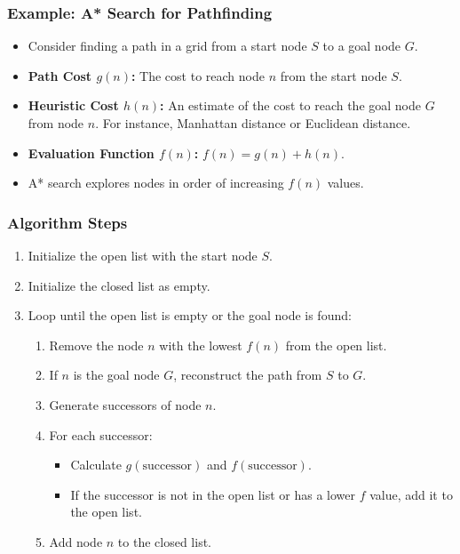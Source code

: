 \documentclass[8pt]{article}
\begin{document}
\subsubsection*{Example: A* Search for Pathfinding}
\begin{itemize}
    \item Consider finding a path in a grid from a start node \(S\) to a goal node \(G\).
    \item \textbf{Path Cost \(g(n)\):} The cost to reach node \(n\) from the start node \(S\).
    \item \textbf{Heuristic Cost \(h(n)\):} An estimate of the cost to reach the goal node \(G\) from node \(n\). For instance, Manhattan distance or Euclidean distance.
    \item \textbf{Evaluation Function \(f(n)\):} \(f(n) = g(n) + h(n)\).
    \item A* search explores nodes in order of increasing \(f(n)\) values.
\end{itemize}

\subsubsection*{Algorithm Steps}
\begin{enumerate}
    \item Initialize the open list with the start node \(S\).
    \item Initialize the closed list as empty.
    \item Loop until the open list is empty or the goal node is found:
    \begin{enumerate}
        \item Remove the node \(n\) with the lowest \(f(n)\) from the open list.
        \item If \(n\) is the goal node \(G\), reconstruct the path from \(S\) to \(G\).
        \item Generate successors of node \(n\).
        \item For each successor:
        \begin{itemize}
            \item Calculate \(g(\text{successor})\) and \(f(\text{successor})\).
            \item If the successor is not in the open list or has a lower \(f\) value, add it to the open list.
        \end{itemize}
        \item Add node \(n\) to the closed list.
    \end{enumerate}
\end{enumerate}
\end{document}
